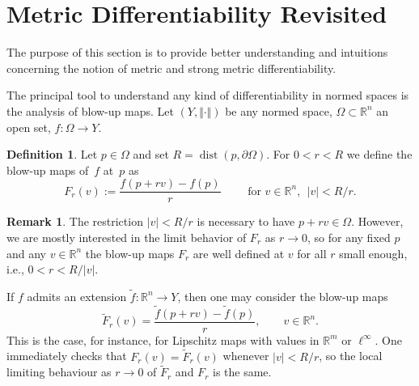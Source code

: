 \documentclass[12pt,leqno]{amsart}
\theoremstyle{definition}
\newtheorem{remark}[theorem]{Remark}
\newtheorem{definition}[theorem]{Definition}
\newcommand{\bbbr}{\mathbb R}
\def\dist{\operatorname{dist}}
\numberwithin{theorem}{section} \numberwithin{equation}{section}
\begin{document}
\section{Metric Differentiability Revisited}
\label{ap:sec3}

The purpose of this section is to provide better understanding and intuitions concerning the notion of metric and strong metric differentiability.

The principal tool to understand any kind of differentiability in normed spaces is the analysis of blow-up maps.
Let $(Y,\Vert\cdot\Vert)$ be any normed space, $\Omega\subset \bbbr^n$ an open set, $f:\Omega\to Y$.
\begin{definition}
    Let $p\in\Omega$ and set $R=\dist(p,\partial\Omega)$. For $0<r<R$ we define the blow-up maps of~$f$ at~$p$ as
    $$
    F_r(v):=\frac{f(p+rv)-f(p)}{r}\qquad \text{ for }v\in\bbbr^n,~~ |v|< R/r.
    $$
\end{definition}
\begin{remark}
The restriction $|v|< R/r$ is necessary to have $p+rv\in\Omega$. However, we are mostly interested in the limit behavior of $F_r$ as $r\to 0$, so for any fixed $p$ and any $v\in\bbbr^n$ the blow-up maps $F_r$ are well defined at $v$ for all $r$ small enough, i.e., $0<r<R/|v|$.

If $f$ admits an extension $\tilde f:\bbbr^n\to Y$, then one may
consider the blow-up maps
$$
\tilde F_r(v)=\frac{\tilde f(p+rv)-\tilde f(p)}{r},
\qquad v\in\bbbr^n .
$$
This is the case, for instance, for Lipschitz maps with values in
$\bbbr^m$ or $\ell^\infty$. One immediately checks that $F_r(v)=\tilde F_r(v)$ whenever $|v|<R/r$,
so the local limiting behaviour as $r\to 0$ of $\tilde{F}_r$ and $F_r$ is the same.
\end{remark}
\end{document}
